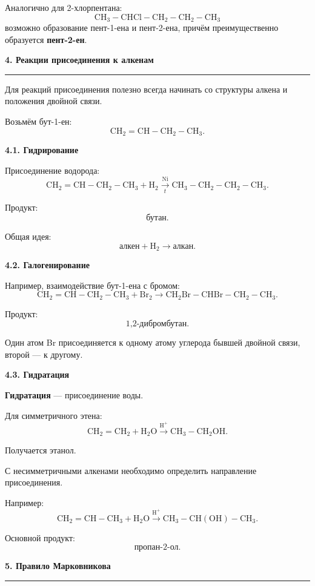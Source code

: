 \documentclass[a4paper,12pt]{article}
\newcommand{\topic}[1]{%
    \vspace{0.5em}
    {\Large\bfseries\textcolor{darkaccent}{#1}}\par
    \vspace{0.25em}
    {\color{accent}\rule{\linewidth}{0.7pt}}
    \vspace{0.4em}
}
\newcommand{\subtopic}[1]{%
    \vspace{0.35em}
    {\large\bfseries\textcolor{accent}{#1}}\par
}
\newcommand{\important}[1]{\textbf{\textcolor{darkaccent}{#1}}}
\begin{document}
Аналогично для 2-хлорпентана:
\[
\mathrm{CH_3-CHCl-CH_2-CH_2-CH_3}
\]
возможно образование пент-1-ена и пент-2-ена, причём преимущественно образуется \important{пент-2-ен}.


\topic{4. Реакции присоединения к алкенам}

Для реакций присоединения полезно всегда начинать со структуры алкена и положения двойной связи.

Возьмём бут-1-ен:
\[
\mathrm{CH_2=CH-CH_2-CH_3}.
\]

\subtopic{4.1. Гидрирование}

Присоединение водорода:
\[
\mathrm{CH_2=CH-CH_2-CH_3+H_2}
\xrightarrow[\ t\ ]{\mathrm{Ni}}
\mathrm{CH_3-CH_2-CH_2-CH_3}.
\]

Продукт:
\[
\boxed{\text{бутан}}.
\]

Общая идея:
\[
\boxed{\text{алкен}+\mathrm{H_2}\longrightarrow\text{алкан}}.
\]


\subtopic{4.2. Галогенирование}

Например, взаимодействие бут-1-ена с бромом:
\[
\mathrm{CH_2=CH-CH_2-CH_3+Br_2}
\longrightarrow
\mathrm{CH_2Br-CHBr-CH_2-CH_3}.
\]

Продукт:
\[
\boxed{\text{1,2-дибромбутан}}.
\]

Один атом Br присоединяется к одному атому углерода бывшей двойной связи, второй --- к другому.


\subtopic{4.3. Гидратация}

\important{Гидратация} --- присоединение воды.

Для симметричного этена:
\[
\mathrm{CH_2=CH_2+H_2O}
\xrightarrow{\mathrm{H^+}}
\mathrm{CH_3-CH_2OH}.
\]

Получается этанол.

С несимметричными алкенами необходимо определить направление присоединения.

Например:
\[
\mathrm{CH_2=CH-CH_3+H_2O}
\xrightarrow{\mathrm{H^+}}
\mathrm{CH_3-CH(OH)-CH_3}.
\]

Основной продукт:
\[
\boxed{\text{пропан-2-ол}}.
\]


\topic{5. Правило Марковникова}
\end{document}
